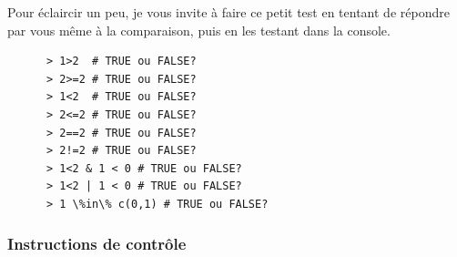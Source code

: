 \documentclass[10.5pt,a4paper]{article}
\begin{document}
    Pour éclaircir un peu, je vous invite à faire ce petit test en tentant de répondre par vous même à la comparaison, puis en les testant dans la console.
    
    \begin{lstlisting}
      > 1>2  # TRUE ou FALSE?
      > 2>=2 # TRUE ou FALSE?
      > 1<2  # TRUE ou FALSE?
      > 2<=2 # TRUE ou FALSE?
      > 2==2 # TRUE ou FALSE?
      > 2!=2 # TRUE ou FALSE?
      > 1<2 & 1 < 0 # TRUE ou FALSE?
      > 1<2 | 1 < 0 # TRUE ou FALSE?
      > 1 \%in\% c(0,1) # TRUE ou FALSE?
      \end{lstlisting}
    
    \subsubsection{Instructions de contrôle}
  
  
  
  
  
\end{document}
